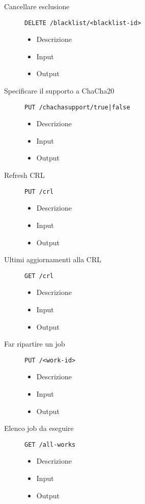 \begin{description}
    \item[Cancellare esclusione]\texttt{DELETE /blacklist/<blacklist-id>}
    \begin{itemize}
        \item Descrizione
        \item Input
        \item Output
    \end{itemize}

    \item[Specificare il supporto a ChaCha20]\texttt{PUT /chachasupport/true|false}
    \begin{itemize}
        \item Descrizione
        \item Input
        \item Output
    \end{itemize}

    \item[Refresh CRL]\texttt{PUT /crl}
    \begin{itemize}
        \item Descrizione
        \item Input
        \item Output
    \end{itemize}

    \item[Ultimi aggiornamenti alla CRL]\texttt{GET /crl}
    \begin{itemize}
        \item Descrizione
        \item Input
        \item Output
    \end{itemize}

    \item[Far ripartire un job]\texttt{PUT /<work-id>}
    \begin{itemize}
        \item Descrizione
        \item Input
        \item Output
    \end{itemize}

    \item[Elenco job da eseguire]\texttt{GET /all-works}
    \begin{itemize}
        \item Descrizione
        \item Input
        \item Output
    \end{itemize}
\end{description}